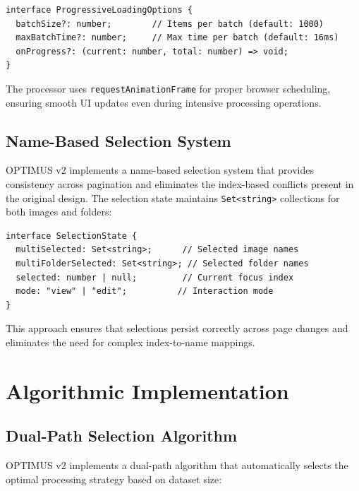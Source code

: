 \documentclass[10pt]{article}
\begin{document}
\begin{lstlisting}[caption={Progressive Processor Configuration}]
interface ProgressiveLoadingOptions {
  batchSize?: number;        // Items per batch (default: 1000)
  maxBatchTime?: number;     // Max time per batch (default: 16ms)
  onProgress?: (current: number, total: number) => void;
}
\end{lstlisting}

The processor uses \texttt{requestAnimationFrame} for proper browser scheduling, ensuring smooth UI updates even during intensive processing operations.

\subsection{Name-Based Selection System}

OPTIMUS v2 implements a name-based selection system that provides consistency across pagination and eliminates the index-based conflicts present in the original design. The selection state maintains \texttt{Set<string>} collections for both images and folders:

\begin{lstlisting}[caption={Selection State Structure}]
interface SelectionState {
  multiSelected: Set<string>;      // Selected image names
  multiFolderSelected: Set<string>; // Selected folder names
  selected: number | null;         // Current focus index
  mode: "view" | "edit";          // Interaction mode
}
\end{lstlisting}

This approach ensures that selections persist correctly across page changes and eliminates the need for complex index-to-name mappings.

\section{Algorithmic Implementation}

\subsection{Dual-Path Selection Algorithm}

OPTIMUS v2 implements a dual-path algorithm that automatically selects the optimal processing strategy based on dataset size:
\end{document}
